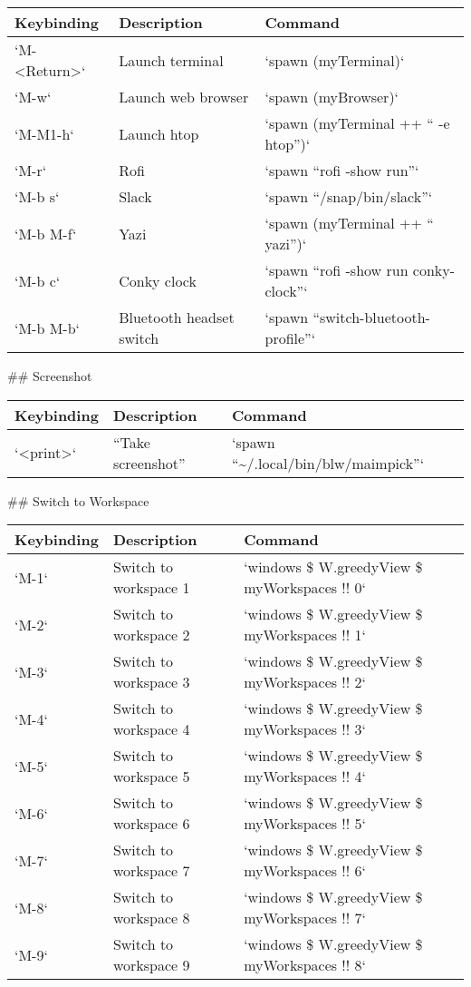 \documentclass[11pt]{article}
\begin{document}
\begin{center}
\begin{tabular}{lll}
Keybinding & Description & Command\\
\hline
`M-<Return>` & Launch terminal & `spawn (myTerminal)`\\
`M-w` & Launch web browser & `spawn (myBrowser)`\\
`M-M1-h` & Launch htop & `spawn (myTerminal ++ `` -e htop'')`\\
`M-r` & Rofi & `spawn ``rofi -show run''`\\
`M-b s` & Slack & `spawn ``/snap/bin/slack''`\\
`M-b M-f` & Yazi & `spawn (myTerminal ++ `` yazi'')`\\
`M-b c` & Conky clock & `spawn ``rofi -show run conky-clock''`\\
`M-b M-b` & Bluetooth headset switch & `spawn ``switch-bluetooth-profile''`\\
\end{tabular}
\end{center}

\#\# Screenshot

\begin{center}
\begin{tabular}{lll}
Keybinding & Description & Command\\
\hline
`<print>` & ``Take screenshot'' & `spawn ``\textasciitilde{}/.local/bin/blw/maimpick''`\\
\end{tabular}
\end{center}

\#\# Switch to Workspace

\begin{center}
\begin{tabular}{lll}
Keybinding & Description & Command\\
\hline
`M-1` & Switch to workspace 1 & `windows \$ W.greedyView \$ myWorkspaces !! 0`\\
`M-2` & Switch to workspace 2 & `windows \$ W.greedyView \$ myWorkspaces !! 1`\\
`M-3` & Switch to workspace 3 & `windows \$ W.greedyView \$ myWorkspaces !! 2`\\
`M-4` & Switch to workspace 4 & `windows \$ W.greedyView \$ myWorkspaces !! 3`\\
`M-5` & Switch to workspace 5 & `windows \$ W.greedyView \$ myWorkspaces !! 4`\\
`M-6` & Switch to workspace 6 & `windows \$ W.greedyView \$ myWorkspaces !! 5`\\
`M-7` & Switch to workspace 7 & `windows \$ W.greedyView \$ myWorkspaces !! 6`\\
`M-8` & Switch to workspace 8 & `windows \$ W.greedyView \$ myWorkspaces !! 7`\\
`M-9` & Switch to workspace 9 & `windows \$ W.greedyView \$ myWorkspaces !! 8`\\
\end{tabular}
\end{center}
\end{document}
